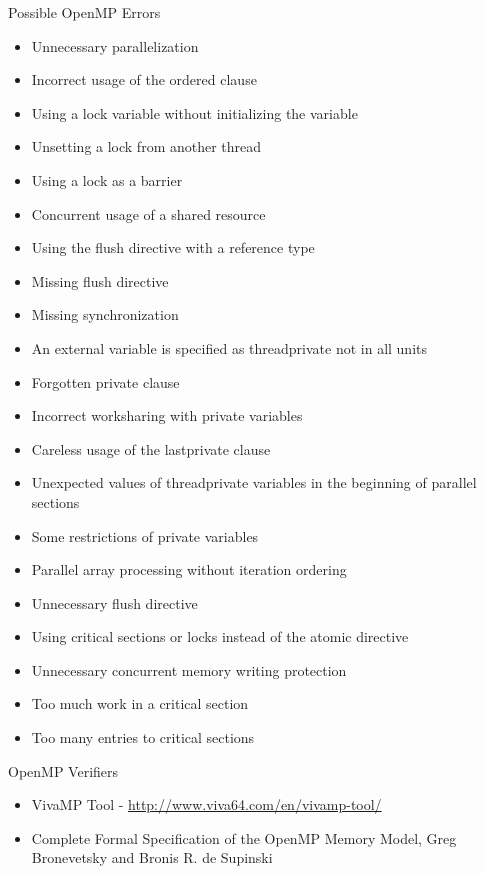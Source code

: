 \documentclass[10pt]{beamer}
\begin{document}
\begin{frame}[shrink]{Possible OpenMP Errors}
\begin{itemize}
\item Unnecessary parallelization
\item Incorrect usage of the ordered clause
\item Using a lock variable without initializing the variable
\item Unsetting a lock from another thread
\item Using a lock as a barrier
\item Concurrent usage of a shared resource
\item Using the flush directive with a reference type
\item Missing flush directive
\item Missing synchronization
\item An external variable is specified as threadprivate not in all units
\item Forgotten private clause
\item Incorrect worksharing with private variables
\item Careless usage of the lastprivate clause
\item Unexpected values of threadprivate variables in the beginning of parallel sections
\item Some restrictions of private variables
\item Parallel array processing without iteration ordering
\item Unnecessary flush directive
\item Using critical sections or locks instead of the atomic directive
\item Unnecessary concurrent memory writing protection
\item Too much work in a critical section
\item Too many entries to critical sections
\end{itemize}
\end{frame}

\begin{frame}{OpenMP Verifiers}
\begin{itemize}
\item VivaMP Tool -  \url{http://www.viva64.com/en/vivamp-tool/}
\item Complete Formal Specification of the OpenMP Memory Model,
  Greg Bronevetsky and Bronis R. de Supinski
\end{itemize}
\end{frame}
\end{document}
